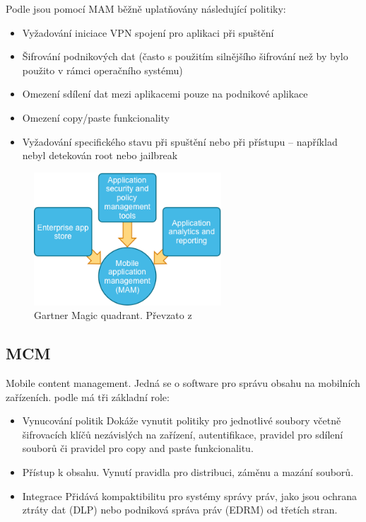  Podle \cite{Gartner_EMM_2016} jsou pomocí MAM běžně uplatňovány následující politiky:
 \begin{itemize}
     \item Vyžadování iniciace VPN spojení pro aplikaci při spuštění
     \item Šifrování podnikových dat (často s použitím silnějšího šifrování než by bylo použito v rámci operačního systému)
     \item Omezení sdílení dat mezi aplikacemi pouze na podnikové aplikace
     \item Omezení copy/paste funkcionality
     \item Vyžadování specifického stavu při spuštění nebo při přístupu -- například nebyl detekován root nebo jailbreak
 \end{itemize}
 
  
\begin{figure}[h]
\includegraphics[width=7cm]{img/MAM-Offering}
\caption{Gartner Magic quadrant. Převzato z } 
\label{MAM:nacrt}
\centering
\end{figure}


\subsection{MCM} 
Mobile content management. Jedná se o software pro správu obsahu na mobilních zařízeních. podle \cite{Gartner_EMM_2016} má tři základní role:
\begin{itemize}
    \item Vynucování politik Dokáže vynutit politiky pro jednotlivé soubory včetně šifrovacích klíčů nezávislých na zařízení, autentifikace, pravidel pro sdílení souborů či pravidel pro copy and paste funkcionalitu.
    \item Přístup k obsahu. Vynutí pravidla pro distribuci, záměnu a mazání souborů.
    \item Integrace Přidává kompaktibilitu pro systémy správy práv, jako jsou ochrana ztráty dat (DLP) nebo podniková správa práv (EDRM) od třetích stran.
\end{itemize}
 
